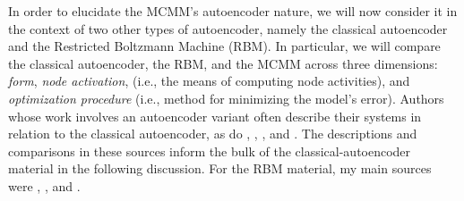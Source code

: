In order to elucidate the MCMM's autoencoder nature, we will now consider it in the context
of two other types of autoencoder, namely the classical autoencoder and the Restricted Boltzmann Machine (RBM).
In particular, we will compare the classical autoencoder, the RBM, and the MCMM across three dimensions: \emph{form}, \emph{node activation}, 
(i.e., the means of computing node activities), and \emph{optimization procedure}
(i.e., method for minimizing the model's error). 
Authors whose work involves an autoencoder variant often describe their systems in relation to 
the classical autoencoder, as do \citet{vincent:2010}, \citet{vincent:2011}, \citet{baldi:2012}, and \citet{chen-and-deng:2016}. 
The descriptions and comparisons in these sources inform the bulk of the classical-autoencoder material in the following discussion. 
For the RBM material, my main sources were \citet{hinton-and-salak:2006}, \citet{cueto-et-al:2009},  and \citet{fischer:2014}.

